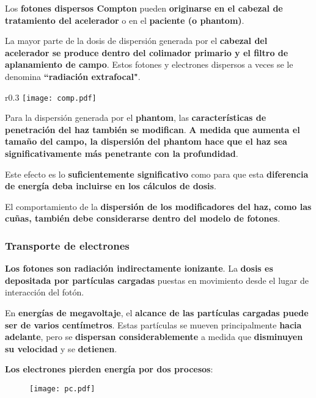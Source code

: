 \documentclass[aspectratio=169,xcolor=dvipsnames,t]{beamer}
\begin{document}
\begin{frame}

    Los \textbf{fotones dispersos Compton} pueden \textbf{originarse en el cabezal de tratamiento del acelerador} o en el \textbf{paciente (o phantom)}.

    La mayor parte de la dosis de dispersión generada por el \textbf{cabezal del acelerador se produce dentro del colimador primario y el filtro de aplanamiento de campo}. Estos fotones y electrones dispersos a veces se le denomina \textbf{``radiación extrafocal"}.

    \begin{wrapfigure}{r}{0.3\textwidth}
        \centering
        \texttt{[image: comp.pdf]}
    \end{wrapfigure}

    Para la dispersión generada por el \textbf{phantom}, las \textbf{características de penetración del haz también se modifican}. \textbf{A medida que aumenta el tamaño del campo, la dispersión del phantom hace que el haz sea significativamente más penetrante con la profundidad}.

    Este efecto es lo \textbf{suficientemente significativo} como para que esta \textbf{diferencia de energía deba incluirse en los cálculos de dosis}. 
    
    El comportamiento de la \textbf{dispersión de los modificadores del haz, como las cuñas, también debe considerarse dentro del modelo de fotones}.

\end{frame}

\begin{frame}

    \frametitle{Transporte de electrones}

    \textbf{Los fotones son radiación indirectamente ionizante}. La \textbf{dosis es depositada por partículas cargadas} puestas en movimiento desde el lugar de interacción del fotón.

    En \textbf{energías de megavoltaje}, el \textbf{alcance de las partículas cargadas puede ser de varios centímetros}. Estas partículas se mueven principalmente \textbf{hacia adelante}, pero se \textbf{dispersan considerablemente} a medida que \textbf{disminuyen su velocidad} y se \textbf{detienen}.

    \textbf{Los electrones pierden energía por dos procesos}:

    \begin{figure}
        \centering
        \texttt{[image: pc.pdf]}
    \end{figure}

\end{frame}
\end{document}
